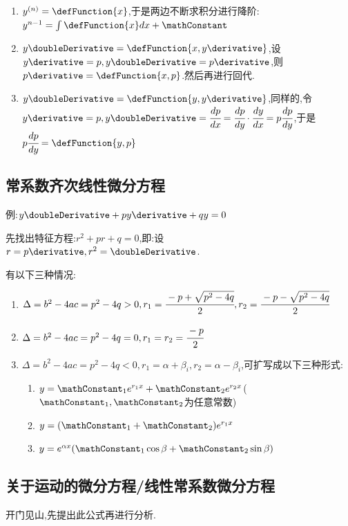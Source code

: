 {{{  \begin{enumerate}
    \item $y^{(n)} = \defFunction{x}$,于是两边不断求积分进行降阶:$y^{n-1} = \int \defFunction{x}dx + \mathConstant$
    \item $y\doubleDerivative = \defFunction{x,y\derivative}$,设$y\derivative = p,y\doubleDerivative = p\derivative$,则$p\derivative = \defFunction{x,p}$.然后再进行回代.
    \item $y\doubleDerivative = \defFunction{y,y\derivative}$,同样的,令$y\derivative = p, y\doubleDerivative = \cfrac{dp}{dx} = \cfrac{dp}{dy}\cdot\cfrac{dy}{dx} = p\cfrac{dp}{dy}$,于是$p\cfrac{dp}{dy} = \defFunction{y,p}$
  \end{enumerate}

}%

\subsection{常系数齐次线性微分方程}{
  例:$y\doubleDerivative + py\derivative + qy = 0$

  先找出特征方程:$r^2 + pr + q = 0$,即:设$r = p\derivative,r^2 = \doubleDerivative$.

  有以下三种情况:
  \begin{enumerate}
    \item $\Delta = b^2 - 4ac = p^2 - 4q > 0,r_1 = \cfrac{-p + \sqrt{p^2 - 4q}}{2}, r_2 = \cfrac{-p - \sqrt{p^2 - 4q}}{2}$
    \item $\Delta = b^2 - 4ac = p^2 - 4q = 0,r_1 = r_2 = \cfrac{-p}{2}$
    \item {$\Delta = b^2 - 4ac = p^2 - 4q < 0,r_1 = \alpha + \beta_i, r_2 = \alpha - \beta_i$,可扩写成以下三种形式:

          \begin{enumerate}
            \item $y = \mathConstant_1e^{r_1x} + \mathConstant_2e^{r_2x}$($\mathConstant_1,\mathConstant_2$为任意常数)
            \item $y = (\mathConstant_1 + \mathConstant_2)e^{r_1x}$
            \item $y = e^{\alpha x}(\mathConstant_1\cos\beta + \mathConstant_2\sin\beta)$
          \end{enumerate}
          }
  \end{enumerate}

}%

\subsection{关于运动的微分方程/线性常系数微分方程}{
开门见山,先提出此公式再进行分析.

}}}
